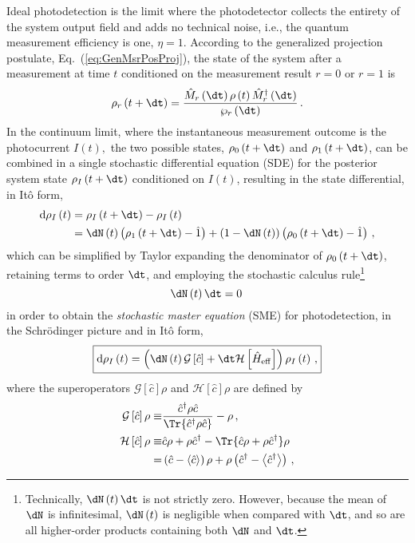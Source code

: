 Ideal photodetection is the limit where the photodetector collects
the entirety of the system output field and adds no technical noise,
i.e., the quantum measurement efficiency is one, $\eta=1$. According
to the generalized projection postulate, Eq.~(\ref{eq:GenMsrPosProj}),
the state of the system after a measurement at time $t$ conditioned
on the measurement result $r=0$ or $r=1$ is 
\begin{equation}
\rho_{r}\left(t+\dt\right)=\frac{\hat{M}_{r}\left(\dt\right)\rho\left(t\right)\hat{M}_{r}^{\dagger}\left(\dt\right)}{\wp_{r}\left(\dt\right)}\,.\label{eq:click:rhoPLUS}
\end{equation}
In the continuum limit, where the instantaneous measurement outcome
is the photocurrent $I\left(t\right),$ the two possible states, $\rho_{0}\left(t+\dt\right)$
and $\rho_{1}\left(t+\dt\right)$, can be combined in a single stochastic
differential equation (SDE) for the posterior system state $\rho_{I}\left(t+\dt\right)$
conditioned on $I\left(t\right)$, resulting in the state differential,
in Itô form,
\begin{align}
\mathrm{d}\rho_{I}\left(t\right) & =\rho_{I}\left(t+\dt\right)-\rho_{I}\left(t\right)\\
 & =\dN\left(t\right)\left(\rho_{1}\left(t+\dt\right)-\hat{1}\right)+\left(1-\dN\left(t\right)\right)\left(\rho_{0}\left(t+\dt\right)-\hat{1}\right)\,,\label{eq:SME-prior}
\end{align}
which can be simplified by Taylor expanding the denominator of $\rho_{0}\left(t+\dt\right)$,
retaining terms to order $\dt$, and employing the stochastic calculus
rule\footnote{Technically, $\dN\left(t\right)\dt$ is not strictly zero. However,
because the mean of $\dN$ is infinitesimal, $\dN\left(t\right)$
is negligible when compared with $\dt$, and so are all higher-order
products containing both $\dN$ and $\dt$. }
\begin{equation}
\dN\left(t\right)\dt=0\,
\end{equation}
in order to obtain the \emph{stochastic master equation} (SME) for
photodetection, in the Schrödinger picture and in Itô form,
\begin{equation}
\boxed{\mathrm{d}\rho_{I}\left(t\right)=\left(\dN\left(t\right)\mathcal{G}\left[\hat{c}\right]+\dt\mathcal{H}\left[\hat{H}_{\mathrm{eff}}\right]\right)\rho_{I}\left(t\right)\,,}\label{eq:photon:SME}
\end{equation}
where the superoperators $\mathcal{G}\left[\hat{c}\right]\rho$ and
$\mathcal{H}\left[\hat{c}\right]\rho$ are defined by
\begin{align}
\mathcal{G}\left[\hat{c}\right]\rho\equiv & \frac{\hat{c}^{\dagger}\rho\hat{c}}{\Tr{\hat{c}^{\dagger}\rho\hat{c}}}-\rho\,,\label{eq:PhotoG}\\
\mathcal{H}\left[\hat{c}\right]\rho\equiv & \hat{c}\rho+\rho\hat{c}^{\dagger}-\Tr{\hat{c}\rho+\rho\hat{c}^{\dagger}}\rho\label{eq:PhotoH}\\
= & \left(\hat{c}-\left\langle \hat{c}\right\rangle \right)\rho+\rho\left(\hat{c}^{\dagger}-\left\langle \hat{c}^{\dagger}\right\rangle \right)\,,
\end{align}
